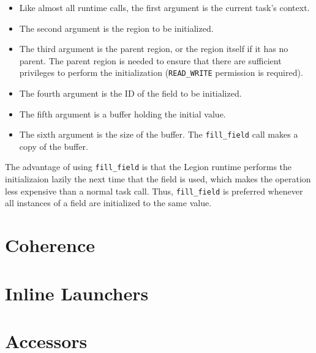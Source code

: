 \begin{itemize}

\item Like almost all runtime calls, the first argument is the current task's context.

\item The second argument is the region to be initialized.

\item The third argument is the parent region, or the region itself if it has no parent.  The parent region is needed
to ensure that there are sufficient privileges to perform the initialization ({\tt READ\_WRITE} permission
is required).

\item The fourth argument is the ID of the field to be initialized.

\item The fifth argument is a buffer holding the initial value.

\item The sixth argument is the size of the buffer.  
The {\tt fill\_field} call makes a copy of the buffer.

\end{itemize}

The advantage of using {\tt fill\_field} is that the Legion runtime performs the initializaion lazily the next time that
the field is used, which makes the operation less expensive than a normal task call.  Thus, {\tt fill\_field} is preferred
whenever all instances of a field are initialized to the same value.


\section{Coherence}
\label{sec:coherence}

\section{Inline Launchers}
\label{sec:inlinelaunch}

\section{Accessors}
\label{sec:accessors}
